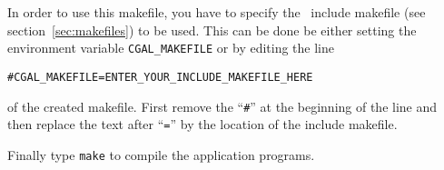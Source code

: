 In order to use this makefile, you have to specify the \cgal\ include
makefile (see section~\ref{sec:makefiles}) to be used. This can be
done be either setting the environment variable
\texttt{CGAL\_MAKEFILE} or by editing the line
\begin{alltt}
  # CGAL_MAKEFILE = ENTER_YOUR_INCLUDE_MAKEFILE_HERE
\end{alltt}
of the created makefile. First remove the ``\texttt{\#}'' at the
beginning of the line and then replace the text after ``\texttt{=}''
by the location of the include makefile. 

Finally type \texttt{make} to compile the application programs.



